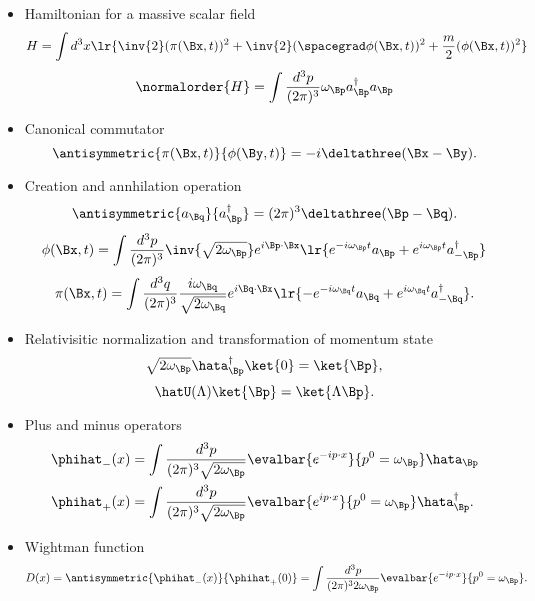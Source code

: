 \begin{itemize}
\item Hamiltonian for a massive scalar field
\begin{dmath}\label{eqn:usefulFormulas:360}
H
= \int d^3 x \lr{ \inv{2} (\pi(\Bx, t))^2 + \inv{2} (\spacegrad \phi(\Bx, t))^2 + \frac{m}{2} (\phi(\Bx, t))^2 }
\end{dmath}
\begin{dmath}\label{eqn:usefulFormulas:380}
\normalorder{H}
= \int \frac{d^3 p}{(2 \pi)^3} \omega_\Bp a_\Bp^\dagger a_\Bp
\end{dmath}
\item Canonical commutator
\begin{dmath}\label{eqn:usefulFormulas:400}
\antisymmetric{\pi(\Bx, t)}{\phi(\By, t)} = -i \deltathree(\Bx - \By).
\end{dmath}
\item Creation and annhilation operation
\begin{dmath}\label{eqn:usefulFormulas:420}
\antisymmetric
{a_\Bq}
{a^\dagger_\Bp}
=
(2 \pi)^3
\deltathree(\Bp - \Bq).
\end{dmath}
\begin{dmath}\label{eqn:usefulFormulas:440}
\phi(\Bx, t)
=
\int \frac{d^3 p}{(2\pi)^3} \inv{\sqrt{2 \omega_\Bp}} e^{i \Bp \cdot \Bx}
\lr{
   e^{-i \omega_\Bp t} a_\Bp
   +
   e^{i \omega_\Bp t} a_{-\Bp}^\dagger
}
\end{dmath}
\begin{dmath}\label{eqn:usefulFormulas:460}
\pi(\Bx, t)
=
\int \frac{d^3 q}{(2\pi)^3}
\frac{i \omega_\Bq }{ \sqrt{2 \omega_\Bq}}
e^{i \Bq \cdot \Bx}
\lr{
   -e^{-i \omega_\Bq t} a_\Bq
   +
   e^{i \omega_\Bq t} a_{-\Bq}^\dagger
}.
\end{dmath}
\item Relativisitic normalization and transformation of momentum state
\begin{dmath}\label{eqn:usefulFormulas:n}
\sqrt{2 \omega_{ \Bp}} \hata^\dagger_{ \Bp} \ket{0} = \ket{\Bp},
\end{dmath}
\begin{dmath}\label{eqn:usefulFormulas:n}
\hatU(\Lambda) \ket{\Bp} = \ket{\Lambda \Bp}.
\end{dmath}
\item Plus and minus operators
\begin{dmath}\label{eqn:usefulFormulas:n}
\begin{aligned}
\phihat_{-}(x) &=
\int \frac{d^3 p}{(2 \pi)^3 \sqrt{2 \omega_\Bp}}
\evalbar{
e^{-i p \cdot x} }{p^0 = \omega_\Bp} \hata_\Bp \\
\phihat_{+}(x) &=
\int \frac{d^3 p}{(2 \pi)^3 \sqrt{2 \omega_\Bp}}
\evalbar{
e^{i p \cdot x} }{p^0 = \omega_\Bp} \hata^\dagger_\Bp.
\end{aligned}
\end{dmath}
\item Wightman function
\begin{equation}\label{eqn:usefulFormulas:n}
D(x)
= \antisymmetric{\phihat_{-}(x)}{\phihat_{+}(0)}
=
\int \frac{d^3 p}{(2 \pi)^3 2 \omega_\Bp}
\evalbar{ e^{-i p \cdot x} }{p^0 = \omega_\Bp}.
\end{equation}
\end{itemize}
